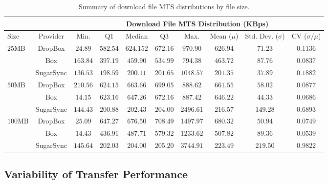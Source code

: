 \begin{table}[t]
\renewcommand{\arraystretch}{1}\addtolength{\tabcolsep}{-3pt}
\tiny
\centering
\begin{tabular}{|p{0.65cm}|c|c|c|c|c|c|c|c|c|}
\hline

& & \multicolumn{8}{|c|}{Download File MTS Distribution (KBps)} \\

\hline
Size 		& Provider & Min. & Q1 & Median & Q3 & Max. & Mean ($\mu$) & Std. Dev. ($\sigma$) & CV ($\sigma/\mu$) \\ \hline
\multirow{3}{*}{$25$MB} 
 & DropBox & $24.89$ & $582.54$ & $624.152$ & $672.16$ & $970.90$ & $626.94$ & $71.23$ & $0.1136$  \\
 & Box & $163.84$ & $397.19$ & $459.90$ & $534.99$ & $794.38$ & $463.72$ & $87.76$ & $0.0837$  \\
 & SugarSync & $136.53$ & $198.59$ & $200.11$ & $201.65$ & $1048.57$ & $201.35$ & $37.89$ & $0.1882$  \\ \hline
 								
\multirow{3}{*}{$50$MB} 
 & DropBox & $210.56$ & $624.15$ & $663.66$ & $699.05$ & $888.62$ & $661.55$ & $58.02$ & $0.0877$   \\
 & Box & $14.15$ & $623.16$ & $647.26$ & $672.16$ & $887.42$ & $646.22$ & $44.33$ & $0.0686$  \\
 & SugarSync & $144.43$ & $200.88$ & $202.43$ & $204.00$ & $2496.61$ & $216.57$ & $149.28$ & $0.6893$  \\ \hline
 								
\multirow{3}{*}{$100$MB} 
 & DropBox & $25.09$ & $647.27$ & $676.50$ & $708.49$ & $1497.97$ & $680.32$ & $50.94$ & $0.0749$  \\
 & Box & $14.43$ & $436.91$ & $487.71$ & $579.32$ & $1233.62$ & $507.82$ & $89.36$ & $0.0539$  \\ 
 & SugarSync & $145.64$ & $202.03$ & $204.00$ & $205.20$ & $3744.91$ & $223.49$ & $219.50$ & $0.9822$  \\ \hline
 
\end{tabular}
\caption{Summary of download file MTS distributions by file size.}
\label{tab:service_variability_file_size_download}
\end{table}


\subsection{Variability of Transfer Performance}
\label{sec:variability}

